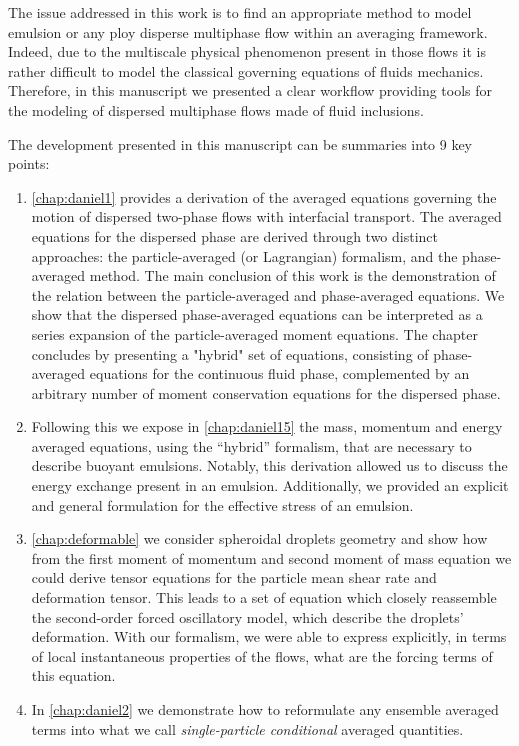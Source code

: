 
The issue addressed in this work is to find an appropriate method to model emulsion or any ploy disperse multiphase flow within an averaging framework.
Indeed, due to the multiscale physical phenomenon present in those flows it is rather difficult to model the classical governing equations of fluids mechanics.  
Therefore, in this manuscript we presented a clear workflow providing tools for the modeling of dispersed multiphase flows made of fluid inclusions. 

The development presented in this manuscript can be summaries into 9 key points:
\begin{enumerate}
    \item \ref{chap:daniel1} provides a derivation of the averaged equations governing the motion of dispersed two-phase flows with interfacial transport. 
    The averaged equations for the dispersed phase are derived through two distinct approaches: the particle-averaged (or Lagrangian) formalism, and the phase-averaged method. 
    The main conclusion of this work is the demonstration of the relation between the particle-averaged and phase-averaged equations. 
    We show that the dispersed phase-averaged equations can be interpreted as a series expansion of the particle-averaged moment equations. 
    The chapter concludes by presenting a "hybrid" set of equations, consisting of phase-averaged equations for the continuous fluid phase, complemented by an arbitrary number of moment conservation equations for the dispersed phase.
    \item Following this we expose in \ref{chap:daniel15} the mass, momentum and energy averaged equations, using the ``hybrid'' formalism, that are necessary to describe buoyant emulsions. 
    Notably, this derivation allowed us to discuss the energy exchange present in an emulsion.
    Additionally, we provided an explicit and general formulation for the effective stress of an emulsion.
    \item \ref{chap:deformable} we consider spheroidal droplets geometry and show how from the first moment of momentum and second moment of mass equation we could derive tensor equations for the particle mean shear rate and deformation tensor. 
    This leads to a set of equation which closely reassemble the second-order forced oscillatory model, which describe the droplets' deformation. 
    With our formalism, we were able to express explicitly, in terms of local instantaneous properties of the flows, what are the forcing terms of this equation.  
    \item In \ref{chap:daniel2} we demonstrate how to reformulate any ensemble averaged terms into what we call \textit{single-particle conditional} averaged quantities. 

\end{enumerate}
